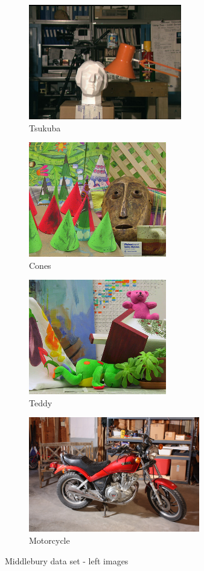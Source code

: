 \begin{figure}[ht]
  \centering
  \begin{subfigure}[t]{0.45\textwidth}
    \centering\includegraphics[height=5cm]{figures/tsul}
    \caption{Tsukuba \cite{Scharstein2002}\label{fig:tsu}}
  \end{subfigure}\hspace{0.5cm}
  \begin{subfigure}[t]{0.45\textwidth}
    \centering\includegraphics[height=5cm]{figures/conl}
    \caption{Cones \cite{Scharstein2003}\label{fig:cones}}
  \end{subfigure}
  \begin{subfigure}[t]{0.45\textwidth}
    \centering\includegraphics[height=5cm]{figures/tedl}
    \caption{Teddy \cite{Scharstein2003}\label{fig:ted}}
  \end{subfigure}\hspace{0.5cm}
  \begin{subfigure}[t]{0.45\textwidth}
    \centering\includegraphics[height=5cm]{figures/motl}
    \caption{Motorcycle \cite{Scharstein2014}\label{fig:mot}}
  \end{subfigure}
  \caption{Middlebury data set - left images \cite{middlebury2016}\label{fig:middlebury}}
\end{figure}

